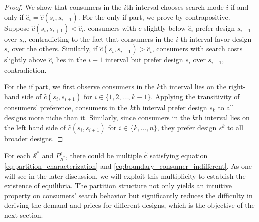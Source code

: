 \documentclass[14pt]{article}
\theoremstyle{plain}
\theoremstyle{definition}
\theoremstyle{remark}
\DeclareRobustCommand\1{\futurelet\oneNext\oneCheck}
\renewcommand{\S}{\mathcal{S}}
\begin{document}
\begin{proof}
We show that consumers in the $i$th interval chooses search mode $i$ if and only if $\hat{c}_i = \hat{c}(s_{i},s_{i+1})$.
For the only if part, we prove by contrapositive. Suppose $\hat{c}(s_{i},s_{i+1})<\hat{c}_i$, consumers with $c$ slightly below $\hat{c}_i$ prefer design $s_{i+1}$ over $s_{i}$, contradicting to the fact that consumers in the $i$ th interval favor design $s_{i}$ over the others. Similarly, if $\hat{c}(s_{i},s_{i+1})>\hat{c}_i$, consumers with search costs slightly above $\hat{c}_i$ lies in the $i+1$ interval but prefer design $s_{i}$ over $s_{i+1}$, contradiction.

For the if part, we first observe consumers in the $k$th interval lies on the right-hand side of $\hat{c}(s_{i}, s_{i+1})$ for $i\in\{1,2,\dots, k-1\}$. Applying the transitivity of consumers' preference, consumers in the $k$th interval prefer design $s_{k}$ to all designs more niche than it. Similarly, since consumers in the $k$th interval lies on the left hand side of $\hat{c}(s_{i}, s_{i+1})$ for $i\in\{k,\dots, n\}$, they prefer design $s^k$ to all broader designs.
\end{proof}
For each $\S^*$ and $P^e_{\S^*}$, there could be multiple $\mathbf{\hat{c}}$ satisfying equation \eqref{eq:partition_characterization} and \eqref{eq:boundary_consumer_indifferent}. As one will see in the later discussion, we will exploit this multiplicity to establish the existence of equilibria.
The partition structure not only yields an intuitive property on consumers' search behavior but significantly reduces the difficulty in deriving the demand and prices for different designs, which is the objective of the next section.



  

\end{document}
